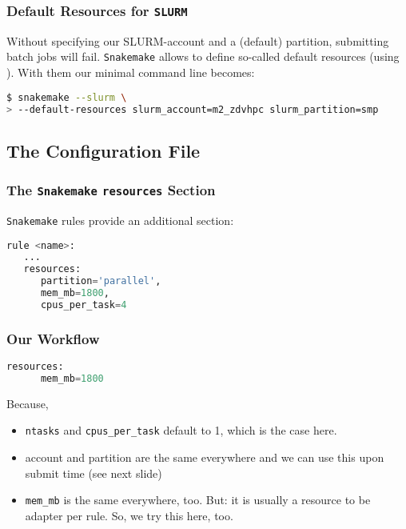 \begin{frame}[fragile]
  \frametitle{Default Resources for \texttt{SLURM}}
  Without specifying our SLURM-account and a (default) partition, submitting batch jobs will fail. \texttt{Snakemake} allows to define so-called default resources (using ). With them our minimal command line becomes:
  \begin{lstlisting}[language=Bash, style=Shell, breaklines=true]
$ snakemake --slurm \
> --default-resources slurm_account=m2_zdvhpc slurm_partition=smp
  \end{lstlisting}
\end{frame}






\subsection{The Configuration File}

\begin{frame}[fragile]
  \frametitle{The \texttt{Snakemake} \texttt{resources} Section}
  \texttt{Snakemake} rules provide an additional section:
  \begin{lstlisting}[language=Python,style=Python]
rule <name>:
   ...
   resources:
      partition='parallel',
      mem_mb=1800,
      cpus_per_task=4
  \end{lstlisting}
\end{frame}

\begin{frame}[fragile]
  \frametitle{Our Workflow}
  \begin{lstlisting}[language=Python,style=Python]
   resources:
      mem_mb=1800
  \end{lstlisting}
  \pause
  Because,
  \begin{itemize}
   \item \texttt{ntasks} and \texttt{cpus\_per\_task} default to 1, which is the case here.
   \item account and partition are the same everywhere and we can use this upon submit time (see next slide)
   \item \texttt{mem\_mb} is the same everywhere, too. But: it is usually a resource to be adapter per rule. So, we try this here, too.
  \end{itemize}
\end{frame}

